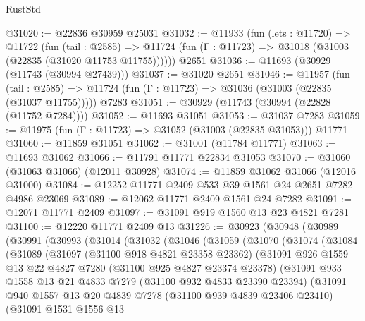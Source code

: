 \begin{lexlean}{RustStd}
\begin{coremodule}
@31020 := @22836 @30959 @25031
@31032 := @11933
    (fun (lets : @11720) =>
    @11722
      (fun (tail : @2585) =>
      @11724 (fun (Γ : @11723) => @31018 (@31003 (@22835 (@31020 @11753 @11755))))))
    @2651
@31036 := @11693 (@30929 (@11743 (@30994 @27439)))
@31037 := @31020 @2651
@31046 := @11957
    (fun (tail : @2585) => @11724 (fun (Γ : @11723) => @31036 (@31003 (@22835 (@31037 @11755)))))
    @7283
@31051 := @30929 (@11743 (@30994 (@22828 (@11752 @7284))))
@31052 := @11693 @31051
@31053 := @31037 @7283
@31059 := @11975 (fun (Γ : @11723) => @31052 (@31003 (@22835 @31053))) @11771
@31060 := @11859 @31051
@31062 := @31001 (@11784 @11771)
@31063 := @11693 @31062
@31066 := @11791 @11771 @22834 @31053
@31070 := @31060 (@31063 @31066) (@12011 @30928)
@31074 := @11859 @31062 @31066 (@12016 @31000)
@31084 := @12252 @11771 @2409 @533 @39 @1561 @24 @2651 @7282 @4986 @23069
@31089 := @12062 @11771 @2409 @1561 @24 @7282
@31091 := @12071 @11771 @2409
@31097 := @31091 @919 @1560 @13 @23 @4821 @7281
@31100 := @12220 @11771 @2409 @13
@31226 := @30923
    (@30948
      (@30989
        (@30991
          (@30993
            (@31014
              (@31032
                (@31046
                  (@31059
                    (@31070
                      (@31074
                        (@31084
                          (@31089
                            (@31097
                              (@31100 @918 @4821 @23358 @23362)
                              (@31091
                                @926
                                @1559
                                @13
                                @22
                                @4827
                                @7280
                                (@31100 @925 @4827 @23374 @23378)
                                (@31091
                                  @933
                                  @1558
                                  @13
                                  @21
                                  @4833
                                  @7279
                                  (@31100 @932 @4833 @23390 @23394)
                                  (@31091
                                    @940
                                    @1557
                                    @13
                                    @20
                                    @4839
                                    @7278
                                    (@31100 @939 @4839 @23406 @23410)
                                    (@31091
                                      @1531
                                      @1556
                                      @13

\end{coremodule}
\end{lexlean}
